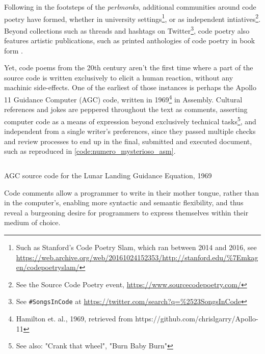 Following in the footsteps of the \emph{perlmonks}, additional communities around code poetry have formed, whether in university settings\footnote{Such as Stanford's Code Poetry Slam, which ran between 2014 and 2016, see \url{https://web.archive.org/web/20161024152353/http://stanford.edu/\%7Emkagen/codepoetryslam/} }, or as independent intiatives\footnote{See the Source Code Poetry event, \url{https://www.sourcecodepoetry.com/}}. Beyond collections such as threads and hashtags on Twitter\footnote{See \lstinline{#SongsInCode} at \url{https://twitter.com/search?q=\%2523SongsInCode}}, code poetry also features artistic publications, such as printed anthologies of code poetry in book form \citep{bertram_code_2012} \citep{holden_code_2016}.

Yet, code poems from the 20th century aren't the first time where a part of the source code is written exclusively to elicit a human reaction, without any machinic side-effects. One of the earliest of those instances is perhaps the Apollo 11 Guidance Computer (AGC) code, written in 1969\footnote{Hamilton et. al., 1969, retrieved from https://github.com/chrislgarry/Apollo-11} in Assembly. Cultural references and jokes are peppered throughout the text as comments, asserting computer code as a means of expression beyond exclusively technical tasks\footnote{See also: "Crank that wheel", "Burn Baby Burn"}, and independent from a single writer's preferences, since they passed multiple checks and review processes to end up in the final, submitted and executed document, such as reproduced in \ref{code:numero_mysterioso_asm}.

\begin{listing}
  \inputminted{ca65}{./corpus/numero_mysterioso.asm}
  \caption{AGC source code for the Lunar Landing Guidance Equation, 1969}
  \label{code:numero_mysterioso_asm}
\end{listing}

Code comments allow a programmer to write in their mother tongue, rather than in the computer's, enabling more syntactic and semantic flexibility, and thus reveal a burgeoning desire for programmers to express themselves within their medium of choice.

